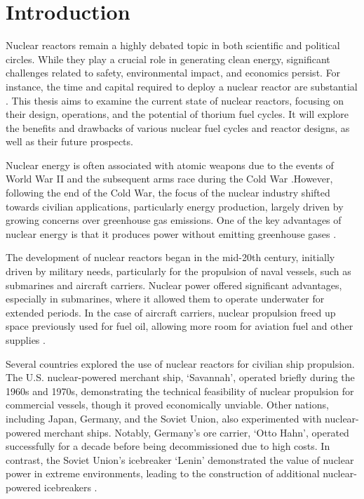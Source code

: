 \chapter{Introduction}

Nuclear reactors remain a highly debated topic in both scientific and political circles. While they play a crucial role in generating clean energy, significant challenges related to safety, environmental impact, and economics persist. For instance, the time and capital required to deploy a nuclear reactor are substantial \cite{Kornecki_Wise_2024}. This thesis aims to examine the current state of nuclear reactors, focusing on their design, operations, and the potential of thorium fuel cycles. It will explore the benefits and drawbacks of various nuclear fuel cycles and reactor designs, as well as their future prospects.

Nuclear energy is often associated with atomic weapons due to the events of World War II and the subsequent arms race during the Cold War \cite{Lamarsh_Baratta_2009}.However, following the end of the Cold War, the focus of the nuclear industry shifted towards civilian applications, particularly energy production, largely driven by growing concerns over greenhouse gas emissions. One of the key advantages of nuclear energy is that it produces power without emitting greenhouse gases \cite{Lamarsh_Baratta_2009}.

The development of nuclear reactors began in the mid-20th century, initially driven by military needs, particularly for the propulsion of naval vessels, such as submarines and aircraft carriers. Nuclear power offered significant advantages, especially in submarines, where it allowed them to operate underwater for extended periods. In the case of aircraft carriers, nuclear propulsion freed up space previously used for fuel oil, allowing more room for aviation fuel and other supplies \cite{Lamarsh_Baratta_2009}.

Several countries explored the use of nuclear reactors for civilian ship propulsion. The U.S. nuclear-powered merchant ship, `Savannah', operated briefly during the 1960s and 1970s, demonstrating the technical feasibility of nuclear propulsion for commercial vessels, though it proved economically unviable. Other nations, including Japan, Germany, and the Soviet Union, also experimented with nuclear-powered merchant ships. Notably, Germany's ore carrier, `Otto Hahn', operated successfully for a decade before being decommissioned due to high costs. In contrast, the Soviet Union's icebreaker `Lenin' demonstrated the value of nuclear power in extreme environments, leading to the construction of additional nuclear-powered icebreakers \cite{Lamarsh_Baratta_2009}.

